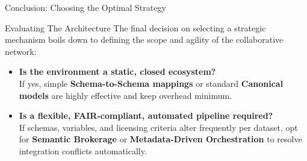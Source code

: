 \documentclass[aspectratio=169]{beamer}
\begin{document}
\begin{frame}{Conclusion: Choosing the Optimal Strategy}
  \centering
  \begin{minipage}{0.85\textwidth}
    \begin{block}{Evaluating The Architecture}
      The final decision on selecting a strategic mechanism boils down to defining the scope and agility of the collaborative network:
    \end{block}
    \vspace{0.8em}
    \begin{itemize}
      \item \textbf{Is the environment a static, closed ecosystem?} \\
      If yes, simple \textcolor{HMCAccent}{\textbf{Schema-to-Schema mappings}} or standard \textcolor{HMCAccent}{\textbf{Canonical models}} are highly effective and keep overhead minimum.
      \vspace{0.8em}
      \item \textbf{Is a flexible, FAIR-compliant, automated pipeline required?} \\
      If schemas, variables, and licensing criteria alter frequently per dataset, opt for \textcolor{HMCAccent}{\textbf{Semantic Brokerage}} or \textcolor{HMCAccent}{\textbf{Metadata-Driven Orchestration}} to resolve integration conflicts automatically.
    \end{itemize}
  \end{minipage}
\end{frame}
\end{document}
